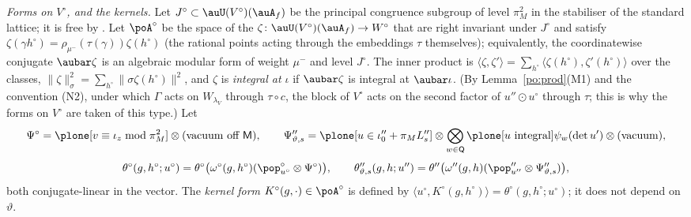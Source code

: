 \documentclass[10pt]{amsart}
\theoremstyle{definition}
\theoremstyle{remark}
\begin{document}
\emph{Forms on $V^\circ$, and the kernels.} Let $J^\circ\subset\auU(V^\circ)(\auA_f)$ be the
principal congruence subgroup of level $\pi_M^2$ in the stabiliser of the standard lattice; it is
free by {\cite[Lemma~14.5]{P46}}. Let $\poA^\circ$ be the space of the $\zeta\colon\auU(V^\circ)
(\auA_f)\to W^\circ$ that are right invariant under $J^\circ$ and satisfy $\zeta(\gamma h^\circ)=
\rho_{\mu^-}(\tau(\gamma))\zeta(h^\circ)$ (the rational points acting through the embeddings
$\tau$ themselves); equivalently, the coordinatewise conjugate $\aubar\zeta$ is an algebraic
modular form of weight $\mu^-$ and level $J^\circ$. The inner product is $\langle\zeta,\zeta'
\rangle=\sum_{h^\circ}\langle\zeta(h^\circ),\zeta'(h^\circ)\rangle$ over the classes,
$\|\zeta\|_\sigma^2=\sum_{h^\circ}\|\sigma\zeta(h^\circ)\|^2$, and $\zeta$ is \emph{integral at
$\iota$} if $\aubar\zeta$ is integral at $\aubar\iota$. (By Lemma~\ref{po:prod}(M1) and the
convention (N2), under which $\Gamma$ acts on $W_{\lambda_V}$ through $\tau\circ c$, the block of
$V^\circ$ acts on the second factor of $u''\odot u^\circ$ through $\tau$; this is why the forms on
$V^\circ$ are taken of this type.) Let
\[
\Psi^\circ=\plone[v\equiv\iota_z\bmod\pi_M^2]\otimes(\text{vacuum off }\mathsf M),\qquad
\Psi''_{\vartheta,s}=\plone[u\in\iota_0''+\pi_ML''_s]\otimes\bigotimes_{w\in\mathsf Q}\plone[u
\text{ integral}]\psi_w(\det u')\otimes(\text{vacuum}),
\]
\[
\theta^\circ(g,h^\circ;u^\circ)=\theta^\circ\bigl(\omega^\circ(g,h^\circ)(\pop^\circ_{u^\circ}
\otimes\Psi^\circ)\bigr),\qquad
\theta''_{\vartheta,s}(g,h;u'')=\theta''\bigl(\omega''(g,h)(\pop''_{u''}\otimes\Psi''_{\vartheta,
s})\bigr),
\]
both conjugate-linear in the vector. The \emph{kernel form} $K^\circ(g,\cdot)\in\poA^\circ$ is
defined by $\langle u^\circ,K^\circ(g,h^\circ)\rangle=\theta^\circ(g,h^\circ;u^\circ)$; it does not
depend on $\vartheta$.
\end{document}
